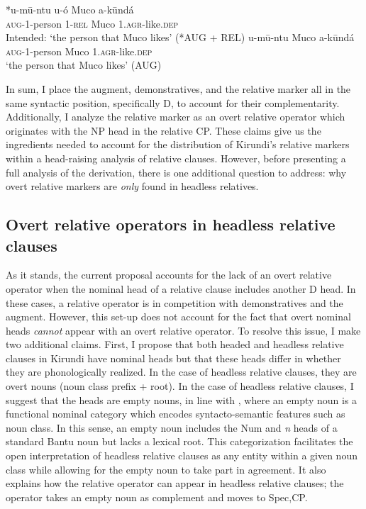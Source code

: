 \documentclass[output=paper,colorlinks,citecolor=brown
]{langscibook}
\begin{document}
\ea \label{ex:myers:augrel}
 \begin{xlist}
 \ex \label{ex:myers:ungram}  \gll {}*u-mū-ntu u-ó Muco a-kūndá\\
 \textsc{aug}-1-person 1-\textsc{rel} Muco 1.\textsc{agr}-like.\textsc{dep}\\
\glt  {}Intended: `the person that Muco likes' \hfill{(*AUG + REL)}
\ex  \gll {}u-mū-ntu Muco a-kūndá\\
\textsc{aug}-1-person Muco 1.\textsc{agr}-like.\textsc{dep}\\
\glt  {}`the person that Muco likes' \hfill{(AUG)}
\end{xlist}
\z

In sum, I place the augment, demonstratives, and the relative marker all in the same syntactic position, specifically D, to account for their complementarity. Additionally, I analyze the relative marker as an overt relative operator which originates with the NP head in the relative CP. These claims give us the ingredients needed to account for the distribution of Kirundi's relative markers within a head-raising analysis of relative clauses. However, before presenting a full analysis of the derivation, there is one additional question to address: why overt relative markers are \emph{only} found in headless relatives.


\subsection{Overt relative operators in headless relative clauses} \label{sec:myers:nullheads}

As it stands, the current proposal accounts for the lack of an overt relative operator when the nominal head of a relative clause includes another D head. In these cases, a relative operator is in competition with demonstratives and the augment. However, this set-up does not account for the fact that overt nominal heads \emph{cannot} appear with an overt relative operator. To resolve this issue, I make two additional claims. First, I propose that both headed and headless relative clauses in Kirundi have nominal heads but that these heads differ in whether they are phonologically realized. In the case of headless relative clauses, they are overt nouns (noun class prefix + root). In the case of headless relative clauses, I suggest that the heads are empty nouns, in line with \citet{Panagiotidis:2003}, where an empty noun is a functional nominal category which encodes syntacto-semantic features such as noun class. In this sense, an empty noun includes the Num and \emph{n} heads of a standard Bantu noun but lacks a lexical root. This categorization facilitates the open interpretation of headless relative clauses as any entity within a given noun class while allowing for the empty noun to take part in agreement. It also explains how the relative operator can appear in headless relative clauses; the operator takes an empty noun as complement and moves to Spec,CP.
\end{document}
